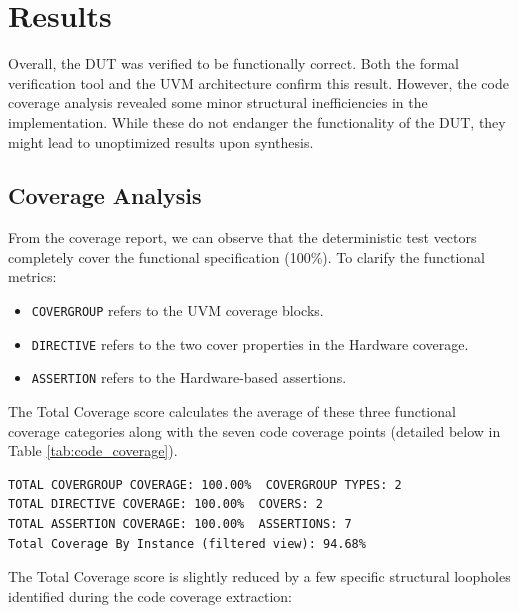 \chapter{Results} 
\label{cha:results}

Overall, the DUT was verified to be functionally correct.
Both the formal verification tool and the UVM architecture confirm this result.
However, the code coverage analysis revealed some minor structural inefficiencies in the implementation.
While these do not endanger the functionality of the DUT, they might lead to unoptimized results upon synthesis.

\section{Coverage Analysis}

From the coverage report, we can observe that the deterministic test vectors completely cover the functional specification (100\%).
To clarify the functional metrics:
\begin{itemize}
    \item \texttt{COVERGROUP} refers to the UVM coverage blocks.
    \item \texttt{DIRECTIVE} refers to the two cover properties in the Hardware coverage.
    \item \texttt{ASSERTION} refers to the Hardware-based assertions.
\end{itemize}

The Total Coverage score calculates the average of these three functional coverage categories along with the seven code coverage points (detailed below in Table \ref{tab:code_coverage}).

\begin{verbatim}
TOTAL COVERGROUP COVERAGE: 100.00%  COVERGROUP TYPES: 2
TOTAL DIRECTIVE COVERAGE: 100.00%  COVERS: 2
TOTAL ASSERTION COVERAGE: 100.00%  ASSERTIONS: 7
Total Coverage By Instance (filtered view): 94.68%
\end{verbatim}

The Total Coverage score is slightly reduced by a few specific structural loopholes identified during the code coverage extraction:

